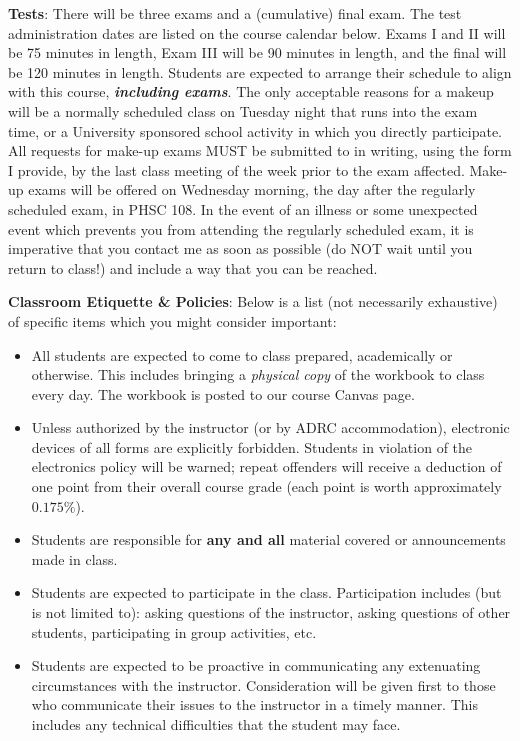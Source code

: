 \documentclass[notes]{subfiles}
\begin{document}
\begin{flushleft}
\textbf{Tests}: 
	There will be three exams and a (cumulative) final exam.  The test administration dates are listed on the course calendar below.  Exams I and II will be 75 minutes in length, Exam III will be 90 minutes in length, and the final will be 120 minutes in length.  Students are expected to arrange their schedule to align with this course, \textbf{\emph{including exams}}.  The only acceptable reasons for a makeup will be a normally scheduled class on Tuesday night that runs into the exam time, or a University sponsored school activity in which you directly participate.  All requests for make-up exams MUST be submitted to in writing, using the form I provide, by the last class meeting of the week prior to the exam affected.  Make-up exams will be offered on Wednesday morning, the day after the regularly scheduled exam, in PHSC 108.  In the event of an illness or some unexpected event which prevents you from attending the regularly scheduled exam, it is imperative that you contact me as soon as possible (do NOT wait until you return to class!) and include a way that you can be reached.  
\\ \medskip
	\newpage
	
	\thispagestyle{empty}
\textbf{Classroom Etiquette \& Policies}: 
		Below is a list (not necessarily exhaustive) of specific items which you might consider important:
		\begin{itemize}
			\item All students are expected to come to class prepared, academically or otherwise.  This includes bringing a \emph{physical copy} of the workbook to class every day.  The workbook is posted to our course Canvas page.
			\item Unless authorized by the instructor (or by ADRC accommodation), electronic devices of all forms are explicitly forbidden.  Students in violation of the electronics policy will be warned; repeat offenders will receive a deduction of one point from their overall course grade (each point is worth approximately $0.175\%$).
			\item Students are responsible for \textbf{any and all} material covered or announcements made in class.
			\item Students are expected to participate in the class.  Participation includes (but is not limited to): asking questions of the instructor, asking questions of other students, participating in group activities, etc.
			\item Students are expected to be proactive in communicating any extenuating circumstances with the instructor.  Consideration will be given first to those who communicate their issues to the instructor in a timely manner.  This includes any technical difficulties that the student may face.
		\end{itemize} \medskip
		

\end{flushleft}
\end{document}
